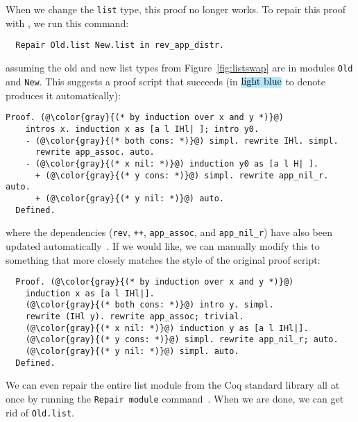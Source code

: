 When we change the \lstinline{list} type, this proof no longer works.
To repair this proof with \toolnamec, we run this command:

\begin{lstlisting}
  Repair Old.list New.list in rev_app_distr.
\end{lstlisting}
assuming the old and new list types from Figure~\ref{fig:listswap} are in modules \lstinline{Old} and \lstinline{New}.
This suggests a proof script that succeeds (in $\codeauto{light blue}$ to denote \toolnamec produces it automatically):

\begin{lstlisting}[backgroundcolor=\color{cyan!30}]
  Proof. (@\color{gray}{(* by induction over x and y *)}@)
    intros x. induction x as [a l IHl| ]; intro y0.
    - (@\color{gray}{(* both cons: *)}@) simpl. rewrite IHl. simpl.
      rewrite app_assoc. auto.
    - (@\color{gray}{(* x nil: *)}@) induction y0 as [a l H| ].
      + (@\color{gray}{(* y cons: *)}@) simpl. rewrite app_nil_r. auto.
      + (@\color{gray}{(* y nil: *)}@) auto.
  Defined.
\end{lstlisting}
where the dependencies (\lstinline{rev}, \lstinline{++}, \lstinline{app_assoc}, and \lstinline{app_nil_r}) have
also been updated automatically~\href{https://github.com/uwplse/pumpkin-pi/blob/v2.0.0/plugin/coq/Swap.v}{}. %
If we would like, we can manually modify this to something that more closely matches the style of the original proof script:

\begin{lstlisting}
  Proof. (@\color{gray}{(* by induction over x and y *)}@)
    induction x as [a l IHl|].
    (@\color{gray}{(* both cons: *)}@) intro y. simpl.
    rewrite (IHl y). rewrite app_assoc; trivial.
    (@\color{gray}{(* x nil: *)}@) induction y as [a l IHl|].
    (@\color{gray}{(* y cons: *)}@) simpl. rewrite app_nil_r; auto.
    (@\color{gray}{(* y nil: *)}@) simpl. auto.
  Defined.
\end{lstlisting}
We can even repair the entire list module from the Coq standard library all at once by running the \lstinline{Repair module}
command~\href{https://github.com/uwplse/pumpkin-pi/blob/v2.0.0/plugin/coq/Swap.v}{}. %
When we are done, we can get rid of \lstinline{Old.list}. %

